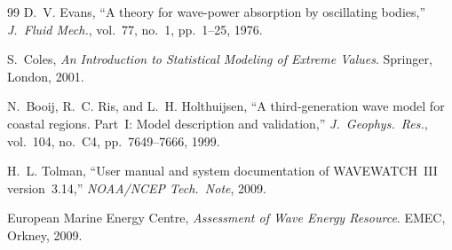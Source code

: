\documentclass[journal]{IEEEtran}
\begin{document}
\begin{thebibliography}{99}
        D.~V. Evans,
        ``A theory for wave-power absorption by oscillating bodies,''
        \emph{J.\ Fluid Mech.}, vol.~77, no.~1, pp.~1--25, 1976.

        S.~Coles,
        \emph{An Introduction to Statistical Modeling of Extreme Values}.
        Springer, London, 2001.

        N.~Booij, R.~C. Ris, and L.~H. Holthuijsen,
        ``A third-generation wave model for coastal regions. Part~I: Model
        description and validation,''
        \emph{J.\ Geophys.\ Res.}, vol.~104, no.~C4,
        pp.~7649--7666, 1999.

        H.~L. Tolman,
        ``User manual and system documentation of WAVEWATCH~III version~3.14,''
        \emph{NOAA/NCEP Tech.\ Note}, 2009.

        European Marine Energy Centre,
        \emph{Assessment of Wave Energy Resource}.
        EMEC, Orkney, 2009.

    \end{thebibliography}
\end{document}
